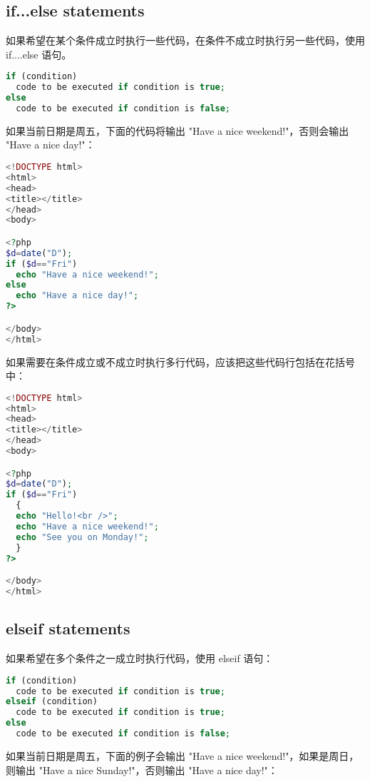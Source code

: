 \subsection{if...else statements}

如果希望在某个条件成立时执行一些代码，在条件不成立时执行另一些代码，使用 if....else 语句。

\begin{lstlisting}[language=PHP]
if (condition)
  code to be executed if condition is true;
else
  code to be executed if condition is false; 
\end{lstlisting}


如果当前日期是周五，下面的代码将输出 "Have a nice weekend!"，否则会输出 "Have a nice day!"：


\begin{lstlisting}[language=PHP]
<!DOCTYPE html>
<html>
<head>
<title></title>
</head>
<body>

<?php
$d=date("D");
if ($d=="Fri")
  echo "Have a nice weekend!"; 
else
  echo "Have a nice day!"; 
?>

</body>
</html>
\end{lstlisting}

如果需要在条件成立或不成立时执行多行代码，应该把这些代码行包括在花括号中：

\begin{lstlisting}[language=PHP]
<!DOCTYPE html>
<html>
<head>
<title></title>
</head>
<body>

<?php
$d=date("D");
if ($d=="Fri")
  {
  echo "Hello!<br />"; 
  echo "Have a nice weekend!";
  echo "See you on Monday!";
  }
?>

</body>
</html>
\end{lstlisting}


\subsection{elseif statements}


如果希望在多个条件之一成立时执行代码，使用 elseif 语句：

\begin{lstlisting}[language=PHP]
if (condition)
  code to be executed if condition is true;
elseif (condition)
  code to be executed if condition is true;
else
  code to be executed if condition is false; 
\end{lstlisting}

如果当前日期是周五，下面的例子会输出 "Have a nice weekend!"，如果是周日，则输出 "Have a nice Sunday!"，否则输出 "Have a nice day!"：

